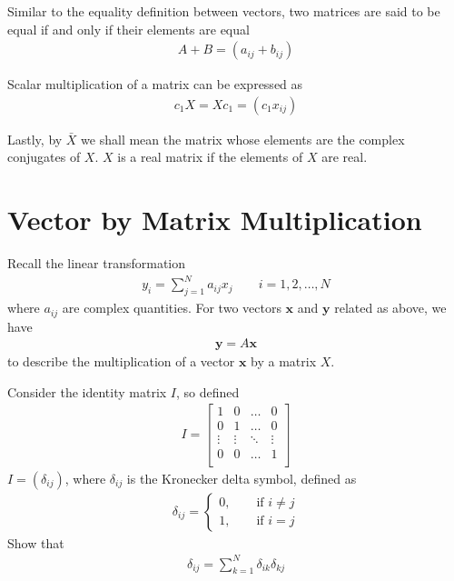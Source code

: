 Similar to the equality definition between vectors, two matrices are said to be equal if and only if their elements are equal \ie 
%
\begin{align}
	A + B = \left(a_{ij} + b_{ij}\right)
\end{align}

Scalar multiplication of a matrix can be expressed as 
%
\begin{align}
	c_1 X = X c_1 = \left(c_1 x_{ij}\right)
\end{align}

Lastly, by $\bar{X}$ we shall mean the matrix whose elements are the complex conjugates of $X$. $X$ is a real matrix if the elements of $X$ are real.

\section{Vector by Matrix Multiplication}

Recall the linear transformation
%
\begin{align}
	y_i = \sum_{j=1}^{N} a_{ij} x_j \qquad i=1,2,\ldots, N
\end{align}
%
where $a_{ij}$ are complex quantities. For two vectors $\bm{x}$ and $\bm{y}$ related as above, we have
%
\begin{align}
	\bm{y} = A \bm{x}
	\label{eq:linear_y}
\end{align}
%
to describe the multiplication of a vector $\bm{x}$ by a matrix $X$. 

\begin{homework}
	Consider the identity matrix $I$, so defined
	\begin{align}
		I = \begin{bmatrix}
		1 & 0 & \ldots & 0 \\
		0 & 1 & \ldots & 0 \\
		\vdots & \vdots & \ddots & \vdots \\
		0 & 0 & \ldots & 1 \\
		\end{bmatrix}
	\end{align}
	\ie $I = (\delta_{ij})$, where $\delta_{ij}$ is the Kronecker delta symbol, defined as
	\begin{align}
		\delta_{ij} = \begin{cases}
		0, \qquad \text{if  } i \neq j \\
		1, \qquad \text{if  }  i=j
		\end{cases}
	\end{align}
	Show that 
	\begin{align}
		\delta_{ij} = \sum_{k=1}^{N} \delta_{ik} \delta_{kj}
	\end{align}
\end{homework}

